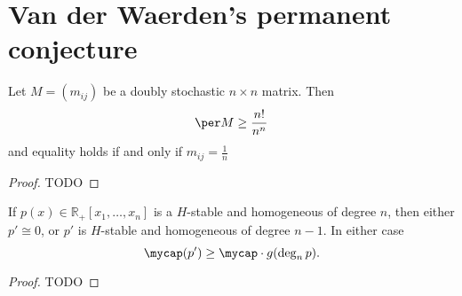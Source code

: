 \chapter{Van der Waerden's permanent conjecture}

\begin{theorem}
  \label{vanderwaerden}
  Let $M = (m_{ij})$ be a doubly stochastic $n \times n$ matrix.
  Then
  \[\per M \ge \frac{n!}{n^n}\]
  and equality holds if and only if $m_{ij} = \frac{1}{n}$
\end{theorem}
\begin{proof}
  TODO
\end{proof}

\begin{proposition}
  \label{gurvit}
  If $p(x)\in \mathbb{R}_+[x_1, \dots, x_n]$ is a $H$-stable and homogeneous of degree $n$, then
  either $p'\cong 0$, or $p'$ is $H$-stable and homogeneous of degree $n - 1$. In either
  case
  \[
  \mycap(p') \ge \mycap\cdot g(\deg_np).
  \]
\end{proposition}
\begin{proof}
  TODO
\end{proof}
